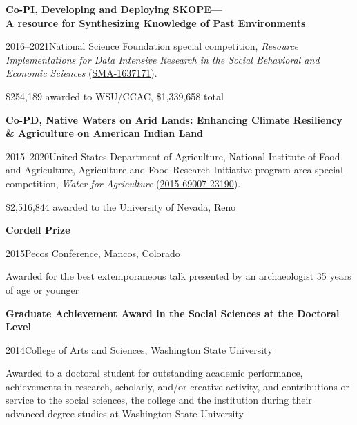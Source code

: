 {\bf Co-PI, Developing and Deploying SKOPE—\\A resource for Synthesizing Knowledge of Past Environments}
\begin{list1}
\item[] 2016–2021\hspace{.2cm}National Science Foundation special competition, \emph{Resource Implementations for Data Intensive Research in the Social Behavioral and Economic Sciences} (\href{https://www.nsf.gov/awardsearch/showAward?AWD_ID=1637171}{SMA-1637171}).
\item[] \$254,189 awarded to WSU/CCAC, \$1,339,658 total
\end{list1}


{\bf Co-PD, Native Waters on Arid Lands: Enhancing Climate Resiliency \& Agriculture on American Indian Land}
\begin{list1}
\item[] 2015–2020\hspace{.2cm}United States Department of Agriculture, National Institute of Food and Agriculture, Agriculture and Food Research Initiative program area special competition, \emph{Water for Agriculture} (\href{https://nativewaters-aridlands.com/}{2015-69007-23190}).
\item[] \$2,516,844 awarded to the University of Nevada, Reno
\end{list1}






{\bf Cordell Prize}
\begin{list1}
\item[] 2015\hspace{.2cm}Pecos Conference, Mancos, Colorado
\item[] Awarded for the best extemporaneous talk presented by an archaeologist 35 years of age or younger
\end{list1}


{\bf Graduate Achievement Award in the Social Sciences at the Doctoral Level}
\begin{list1}
\item[] 2014\hspace{.2cm}College of Arts and Sciences, Washington State University
\item[] Awarded to a doctoral student for outstanding academic performance, achievements in research, scholarly, and/or creative activity, and contributions or service to the social sciences, the college and the institution during their advanced degree studies at Washington State University
\end{list1}


